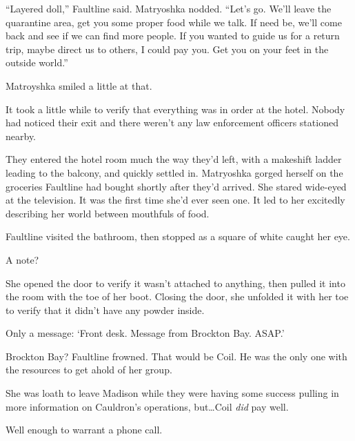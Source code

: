 ``Layered doll,'' Faultline said.  Matryoshka nodded.  ``Let's go.  We'll leave the quarantine area, get you some proper food while we talk.  If need be, we'll come back and see if we can find more people.  If you wanted to guide us for a return trip, maybe direct us to others, I could pay you.  Get you on your feet in the outside world.''



Matroyshka smiled a little at that.



\sectionbreak



It took a little while to verify that everything was in order at the hotel.  Nobody had noticed their exit and there weren't any law enforcement officers stationed nearby.



They entered the hotel room much the way they'd left, with a makeshift ladder leading to the balcony, and quickly settled in.  Matryoshka gorged herself on the groceries Faultline had bought shortly after they'd arrived.  She stared wide-eyed at the television.  It was the first time she'd ever seen one.  It led to her excitedly describing her world between mouthfuls of food.



Faultline visited the bathroom, then stopped as a square of white caught her eye.



A note?



She opened the door to verify it wasn't attached to anything, then pulled it into the room with the toe of her boot.  Closing the door, she unfolded it with her toe to verify that it didn't have any powder inside.



Only a message: `Front desk.  Message from Brockton Bay.  ASAP.'



Brockton Bay?  Faultline frowned.  That would be Coil.  He was the only one with the resources to get ahold of her group.



She was loath to leave Madison while they were having some success pulling in more information on Cauldron's operations, but\ldots Coil \emph{did} pay well.



Well enough to warrant a phone call.



